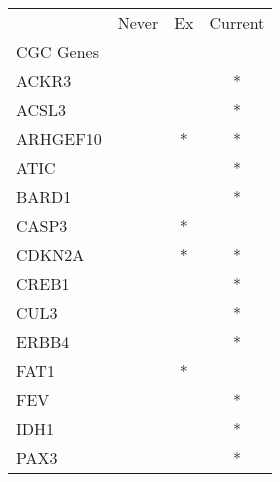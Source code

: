 \begin{tabular}{lccc}
\toprule
{} & Never & Ex & Current \\
CGC Genes &       &    &         \\
\midrule
ACKR3     &       &    &       * \\
ACSL3     &       &    &       * \\
ARHGEF10  &       &  * &       * \\
ATIC      &       &    &       * \\
BARD1     &       &    &       * \\
CASP3     &       &  * &         \\
CDKN2A    &       &  * &       * \\
CREB1     &       &    &       * \\
CUL3      &       &    &       * \\
ERBB4     &       &    &       * \\
FAT1      &       &  * &         \\
FEV       &       &    &       * \\
IDH1      &       &    &       * \\
PAX3      &       &    &       * \\
\bottomrule
\end{tabular}
